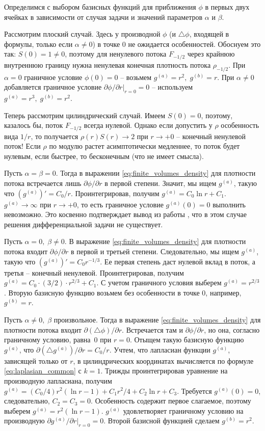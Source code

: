 Определимся с выбором базисных функций для приближения $\phi$ в первых двух ячейках в зависимости от случая задачи и значений параметров $\alpha$ и $\beta$.

Рассмотрим плоский случай. Здесь у производной $\phi$ (и $\triangle \phi$, входящей в формулы, только если $\alpha \neq 0$) в точке $0$ не ожидается особенностей. Обоснуем это так: $S(0) = 1 \neq 0$, поэтому для ненулевого потока $F_{-1/2}$ через крайнюю внутреннюю границу нужна ненулевая конечная плотность потока $\rho_{-1/2}$. При $\alpha = 0$ граничное условие $\phi(0) = 0$ -- возьмем $g^{(a)} = r^2, \; g^{(b)} = r$. При $\alpha \neq 0$ добавляется граничное условие $\partial \phi / \partial r |_{r = 0} = 0$ -- используем $g^{(a)} = r^3, \; g^{(b)} = r^2$.

Теперь рассмотрим цилиндрический случай. Имеем $S(0) = 0$, поэтому, казалось бы, поток $F_{-1/2}$ всегда нулевой. Однако если допустить у $\rho$ особенность вида $1/r$, то получается $\rho(r) S(r) \to 2$ при $r \to +0$ -- конечный ненулевой поток! Если $\rho$ по модулю растет асимптотически медленнее, то поток будет нулевым, если быстрее, то бесконечным (что не имеет смысла).

Пусть $\alpha = \beta = 0$. Тогда в выражении \eqref{eq:finite_volumes_density} для плотности потока встречается лишь $\partial \phi / \partial r$ в первой степени. Значит, мы ищем $g^{(a)}$, такую что $(g^{(a)})' = C_0/r$. Проинтегрировав, получим $g^{(a)} = C_0 \ln r + C_1$. $g^{(a)} \to \infty$ при $r \to +0$, то есть граничное условие $g^{(a)}(0) = 0$ выполнить невозможно. Это косвенно подтверждает вывод из работы \cite{zipunova_higher_codimension}, что в этом случае решения дифференциальной задачи не существует.

Пусть $\alpha = 0, \; \beta \neq 0$. В выражение \eqref{eq:finite_volumes_density} для плотности потока входит $\partial \phi / \partial r$ в первой и третьей степени. Следовательно, мы ищем $g^{(a)}$, такую что $(g^{(a)})' = C_0 r^{-1/3}$. Ее первая степень даст нулевой вклад в поток, а третья -- конечный ненулевой. Проинтегрировав, получим $g^{(a)} = C_0 \cdot (3/2) \cdot r^{2/3} + C_1$. С учетом граничного условия выберем $g^{(a)} = r^{2/3}$. Вторую базисную функцию возьмем без особенности в точке $0$, например, $g^{(b)} = r$.

Пусть $\alpha \neq 0, \; \beta$ произвольное. Тогда в выражение \eqref{eq:finite_volumes_density} для плотности потока входит $\partial (\triangle \phi) / \partial r$. Встречается там и $\partial \phi / \partial r$, но она, согласно граничному условию, равна~$0$ при $r = 0$. Отыщем такую базисную функцию $g^{(a)}$, что $\partial (\triangle g^{(a)}) / \partial r = C_0 / r$. Учтем, что лапласиан функции $g^{(a)}$, зависящей только от $r$, в цилиндрических координатах вычисляется по формуле \eqref{eq:laplasian_common} с $k = 1$. Трижды проинтегрировав уравнение на производную лапласиана, получим $g^{(a)} = (C_0/4) r^2 (\ln r - 1) + C_1 r^2 / 4 + C_2 \ln r + C_3$. Требуется $g^{(a)}(0) = 0$, следовательно, $C_2 = C_3 = 0$. Особенность содержит первое слагаемое, поэтому выберем $g^{(a)} = r^2 (\ln r - 1)$. $g^{(a)}$ удовлетворяет граничному условию на производную $\partial g^{(a)} / \partial r|_{r = 0} = 0$. Второй базисной функцией сделаем $g^{(b)} = r^2$.

